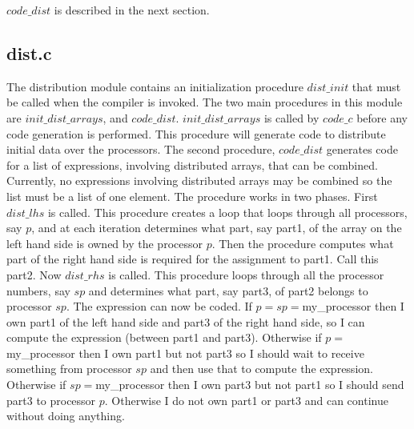 $code\_dist$ is described in the next section.

\subsection{dist.c}
The distribution module contains an initialization procedure $dist\_init$
that must be called when the compiler is invoked.  The two main procedures
in this module are $init\_dist\_arrays$, and $code\_dist$.  
$init\_dist\_arrays$ is called
by $code\_c$ before any code generation is performed.  This procedure will
generate code to distribute initial data over the processors.  The second
procedure, $code\_dist$ generates code for a list of expressions, involving
distributed arrays, that can be combined.  Currently, no expressions involving
distributed arrays may be combined so the list must be a list of one element.
The procedure works in two phases.  First $dist\_lhs$ is called.  This 
procedure
creates a loop that loops through all processors, say $p$, and at each 
iteration determines what part, say part1, of the array on the left hand side 
is
owned by the processor $p$.  Then the procedure computes what part of the right
hand side is required for the assignment to part1.  Call this part2.  Now
$dist\_rhs$ is called.  This procedure loops through all the processor numbers,
say $sp$ and determines what part, say part3, of part2 belongs to processor
$sp$.  The expression can now be coded.  If $p=sp=$my\_processor then
I own part1 of the left hand side and part3 of the right hand side, so I can
compute the expression (between part1 and part3).  Otherwise if 
$p=$my\_processor then I own part1 but 
not part3 so I should wait to receive something from processor $sp$ and then 
use that to compute the expression.  Otherwise if $sp=$my\_processor then
I own part3 but not part1 so I should send part3 to processor $p$.  Otherwise
I do not own part1 or part3 and can continue without doing anything.

